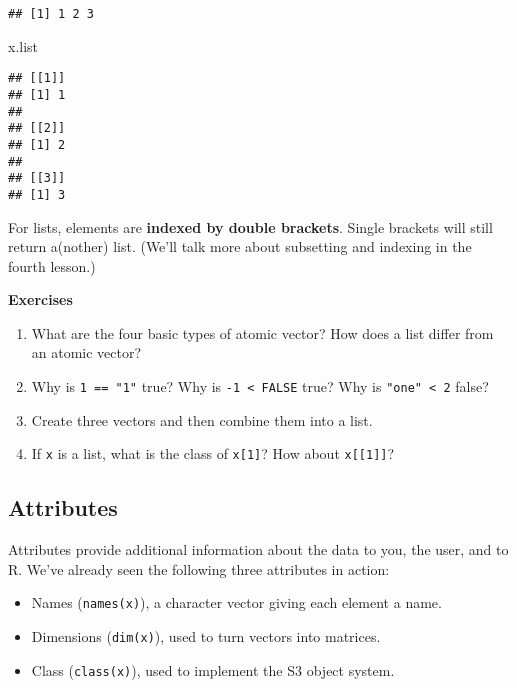\documentclass[
]{book}
\newenvironment{Shaded}{\begin{snugshade}}{\end{snugshade}}
\newcommand{\NormalTok}[1]{#1}
\begin{document}
\begin{verbatim}
## [1] 1 2 3
\end{verbatim}

\begin{Shaded}
\begin{Highlighting}[]
\NormalTok{x.list}
\end{Highlighting}
\end{Shaded}

\begin{verbatim}
## [[1]]
## [1] 1
## 
## [[2]]
## [1] 2
## 
## [[3]]
## [1] 3
\end{verbatim}

For lists, elements are \textbf{indexed by double brackets}. Single brackets will still return a(nother) list. (We'll talk more about subsetting and indexing in the fourth lesson.)

\textbf{Exercises}

\begin{enumerate}
\def\labelenumi{\arabic{enumi}.}
\item
  What are the four basic types of atomic vector? How does a list differ from an
  atomic vector?
\item
  Why is \texttt{1\ ==\ "1"} true? Why is \texttt{-1\ \textless{}\ FALSE} true? Why is \texttt{"one"\ \textless{}\ 2} false?
\item
  Create three vectors and then combine them into a list.
\item
  If \texttt{x} is a list, what is the class of \texttt{x{[}1{]}}? How about \texttt{x{[}{[}1{]}{]}}?
\end{enumerate}

\hypertarget{attributes}{%
\subsection{Attributes}\label{attributes}}

Attributes provide additional information about the data to you, the user, and to R. We've already seen the following three attributes in action:

\begin{itemize}
\item
  Names (\texttt{names(x)}), a character vector giving each element a name.
\item
  Dimensions (\texttt{dim(x)}), used to turn vectors into matrices.
\item
  Class (\texttt{class(x)}), used to implement the S3 object system.
\end{itemize}
\end{document}
